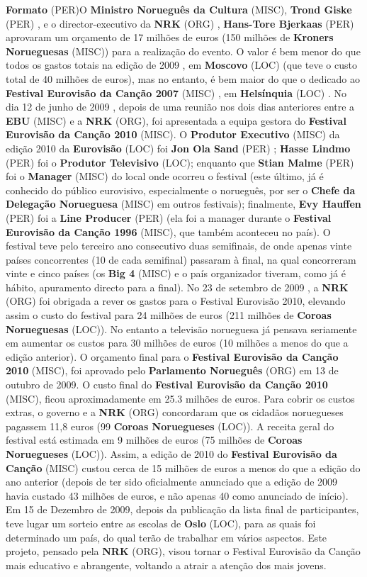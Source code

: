 \documentclass[12pt,a4paper]{article}
\begin{document}
\textbf{Formato} (PER)O \textbf{Ministro Norueguês da Cultura} (MISC), \textbf{Trond Giske} (PER) , e o director-executivo da \textbf{NRK} (ORG) , \textbf{Hans-Tore Bjerkaas} (PER) aprovaram um orçamento de 17 milhões de euros (150 milhões de \textbf{Kroners Norueguesas} (MISC)) para a realização do evento. O valor é bem menor do que todos os gastos totais na edição de 2009 , em \textbf{Moscovo} (LOC) (que teve o custo total de 40 milhões de euros), mas no entanto, é bem maior do que o dedicado ao \textbf{Festival Eurovisão da Canção 2007} (MISC) , em \textbf{Helsínquia} (LOC) . No dia 12 de junho de 2009 , depois de uma reunião nos dois dias anteriores entre a \textbf{EBU} (MISC) e a \textbf{NRK} (ORG), foi apresentada a equipa gestora do \textbf{Festival Eurovisão da Canção 2010} (MISC). O \textbf{Produtor Executivo} (MISC) da edição 2010 da \textbf{Eurovisão} (LOC) foi \textbf{Jon Ola Sand} (PER) ; \textbf{Hasse Lindmo} (PER) foi o \textbf{Produtor Televisivo} (LOC); enquanto que \textbf{Stian Malme} (PER) foi o \textbf{Manager} (MISC) do local onde ocorreu o festival (este último, já é conhecido do público eurovisivo, especialmente o norueguês, por ser o \textbf{Chefe da Delegação Norueguesa} (MISC) em outros festivais); finalmente, \textbf{Evy Hauffen} (PER) foi a \textbf{Line Producer} (PER) (ela foi a manager durante o \textbf{Festival Eurovisão da Canção 1996} (MISC), que também aconteceu no país). O festival teve pelo terceiro ano consecutivo duas semifinais, de onde apenas vinte países concorrentes (10 de cada semifinal) passaram à final, na qual concorreram vinte e cinco países (os \textbf{Big 4} (MISC) e o país organizador tiveram, como já é hábito, apuramento directo para a final). No 23 de setembro de 2009 , a \textbf{NRK} (ORG) foi obrigada a rever os gastos para o Festival Eurovisão 2010, elevando assim o custo do festival para 24 milhões de euros (211 milhões de \textbf{Coroas Norueguesas} (LOC)). No entanto a televisão norueguesa já pensava seriamente em aumentar os custos para 30 milhões de euros (10 milhões a menos do que a edição anterior). O orçamento final para o \textbf{Festival Eurovisão da Canção 2010} (MISC), foi aprovado pelo \textbf{Parlamento Norueguês} (ORG) em 13 de outubro de 2009. O custo final do \textbf{Festival Eurovisão da Canção 2010} (MISC), ficou aproximadamente em 25.3 milhões de euros. Para cobrir os custos extras, o governo e a \textbf{NRK} (ORG) concordaram que os cidadãos noruegueses pagassem 11,8 euros (99 \textbf{Coroas Noruegueses} (LOC)). A receita geral do festival está estimada em 9 milhões de euros (75 milhões de \textbf{Coroas Noruegueses} (LOC)). Assim, a edição de 2010 do \textbf{Festival Eurovisão da Canção} (MISC) custou cerca de 15 milhões de euros a menos do que a edição do ano anterior (depois de ter sido oficialmente anunciado que a edição de 2009 havia custado 43 milhões de euros, e não apenas 40 como anunciado de início). Em 15 de Dezembro de 2009, depois da publicação da lista final de participantes, teve lugar um sorteio entre as escolas de \textbf{Oslo} (LOC), para as quais foi determinado um país, do qual terão de trabalhar em vários aspectos. Este projeto, pensado pela \textbf{NRK} (ORG), visou tornar o Festival Eurovisão da Canção mais educativo e abrangente, voltando a atrair a atenção dos mais jovens.
\end{document}
